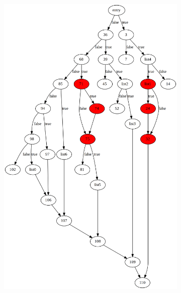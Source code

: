 \begin{figure}[htbp]
	\centering
	\begin{subfigure}[ht]{0.45\textwidth}
		\includegraphics[width=\textwidth]{inc/appendices/control_flow_analysis_example/step3_before.png}
	\end{subfigure}
	\qquad
	\begin{subfigure}[ht]{0.45\textwidth}

\end{subfigure}
\end{figure}
